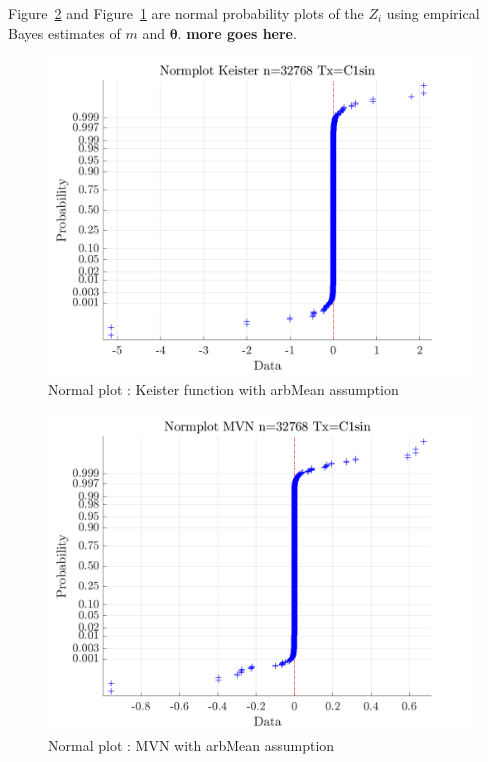 \documentclass[twocolumn]{svjour3}          %
\newcommand{\bm}[1]{\boldsymbol{#1}}
\newcommand{\vtheta}{{\bm{\theta}}}
\newcommand\figref{Figure~\ref}
\begin{document}
\figref{fig:mvn-normplot} and \figref{fig:keister-normplot} are normal probability plots of the $Z_i$ using empirical Bayes estimates of $m$ and $\vtheta$. \textbf{more goes here}.



\begin{figure}
	\centering
	\includegraphics[width=0.9\linewidth]{"figures/arbMean/Keister/C1sin/Keister Normplot d_2 bernoulli_2 Period_C1sin n_32768"}
	\caption{Normal plot : Keister function with arbMean assumption}
	\label{fig:keister-normplot}
\end{figure}




\begin{figure}
	\centering
	\includegraphics[width=0.9\linewidth]{"figures/arbMean/MVN/C1sin/MVN Normplot d_2 bernoulli_2 Period_C1sin n_32768"}
	\caption{Normal plot : MVN with arbMean assumption}
	\label{fig:mvn-normplot}
\end{figure}
\end{document}
